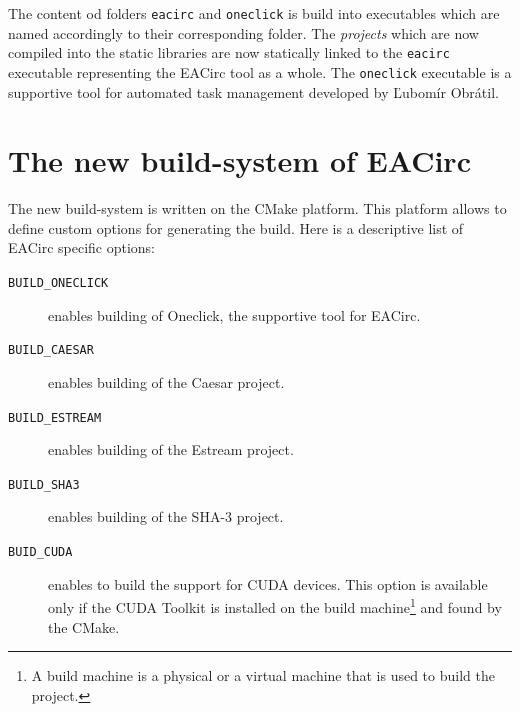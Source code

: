 \documentclass[12pt,oneside]{fithesis2}
\begin{document}
The content od folders \texttt{eacirc} and \texttt{oneclick} is build into executables which are named accordingly to their corresponding folder. The \emph{projects} which are now compiled into the static libraries are now statically linked to the \texttt{eacirc} executable representing the EACirc tool as a whole. The \texttt{oneclick} executable is a supportive tool for automated task management developed by Ľubomír Obrátil. \cite{oneclick}

\section{The new build-system of EACirc}

The new build-system is written on the CMake platform. This platform allows to define custom options for generating the build. Here is a descriptive list of EACirc specific options:

\begin{description}
	\item[\texttt{BUILD\_ONECLICK}] enables building of Oneclick, the supportive tool for EACirc.
	\item[\texttt{BUILD\_CAESAR}] enables building of the Caesar project.
	\item[\texttt{BUILD\_ESTREAM}] enables building of the Estream project.
	\item[\texttt{BUILD\_SHA3}] enables building of the SHA-3 project.
	\item[\texttt{BUID\_CUDA}] enables to build the support for CUDA devices. This option is available only if the CUDA Toolkit \cite{cuda_toolkit} is installed on the build machine\footnote{A build machine is a physical or a virtual machine that is used to build the project.} and found by the CMake.
\end{description}
\end{document}
